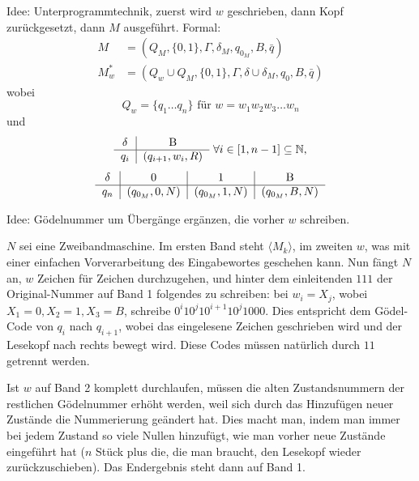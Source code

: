 Idee: Unterprogrammtechnik, zuerst wird $w$ geschrieben, dann Kopf zurückgesetzt, dann $M$ ausgeführt. Formal:
\begin{align*}
	M &= (Q_M, \{0, 1\}, \Gamma, \delta_M, q_{0_M}, B, \bar{q})\\
	M_w^* &= (Q_w \cup Q_M, \{0, 1\}, \Gamma, \delta \cup \delta_M, q_0, B, \bar{q})
\end{align*}
wobei
\[
	Q_w = \{q_1 \dots q_n\} \text{ für } w = w_1w_2w_3\dots w_n
\]
und
\[
	\begin{tabular}{c|c}
		$\delta$ & B\\
		\hline
		$q_i$ & $(q_{i+1}, w_i, R)$
	\end{tabular}
	\ \forall i \in [1, n - 1] \subseteq \mathbb{N},
\]
\[
	\begin{tabular}{c|c|c|c}
		$\delta$ & 0 & 1 & B\\
		\hline
		$q_n$ & $(q_{0_M}, 0, N)$ & $(q_{0_M}, 1, N)$ & $(q_{0_M}, B, N)$
	\end{tabular}
\]


Idee: Gödelnummer um Übergänge ergänzen, die vorher $w$ schreiben.

$N$ sei eine Zweibandmaschine. Im ersten Band steht $\langle M_k \rangle$, im
zweiten $w$, was mit einer einfachen Vorverarbeitung des Eingabewortes geschehen
kann. Nun fängt $N$ an, $w$ Zeichen für Zeichen durchzugehen, und hinter dem
einleitenden $111$ der Original-Nummer auf Band 1 folgendes zu schreiben: bei
$w_i=X_j$, wobei $X_1=0, X_2=1, X_3=B$, schreibe $0^i10^j10^{i+1}10^j1000$. Dies
entspricht dem Gödel-Code von $q_i$ nach $q_{i+1}$, wobei das eingelesene
Zeichen geschrieben wird und der Lesekopf nach rechts bewegt wird. Diese Codes
müssen natürlich durch $11$ getrennt werden.

Ist $w$ auf Band 2 komplett
durchlaufen, müssen die alten Zustandsnummern der restlichen Gödelnummer erhöht
werden, weil sich durch das Hinzufügen neuer Zustände die Nummerierung geändert
hat. Dies macht man, indem man immer bei jedem Zustand so viele Nullen
hinzufügt, wie man vorher neue Zustände eingeführt hat ($n$ Stück plus die, die
man braucht, den Lesekopf wieder zurückzuschieben). Das Endergebnis steht dann
auf Band 1.
